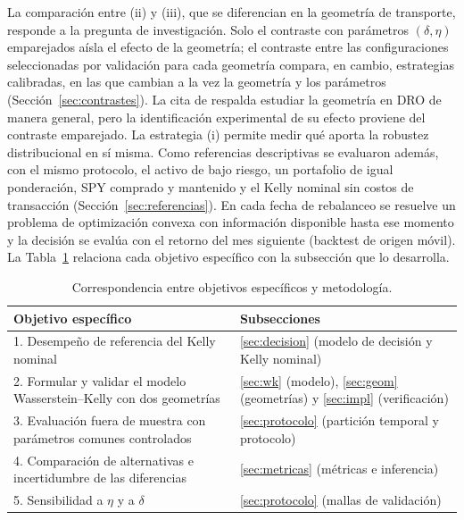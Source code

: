 La comparación entre (ii) y (iii), que se diferencian en la geometría de transporte, responde a la pregunta de investigación. Solo el contraste con parámetros $(\delta,\eta)$ emparejados aísla el efecto de la geometría; el contraste entre las configuraciones seleccionadas por validación para cada geometría compara, en cambio, estrategias calibradas, en las que cambian a la vez la geometría y los parámetros (Sección~\ref{sec:contrastes}). La cita de \citet{liu2022} respalda estudiar la geometría en DRO de manera general, pero la identificación experimental de su efecto proviene del contraste emparejado. La estrategia (i) permite medir qué aporta la robustez distribucional en sí misma.
 Como referencias descriptivas se evaluaron además, con el mismo protocolo, el activo de bajo riesgo, un portafolio de igual ponderación, SPY comprado y mantenido y el Kelly nominal sin costos de transacción (Sección~\ref{sec:referencias}).
 En cada fecha de rebalanceo se resuelve un problema de optimización convexa con información disponible hasta ese momento y la decisión se evalúa con el retorno del mes siguiente (backtest de origen móvil). La Tabla~\ref{tab:objetivos} relaciona cada objetivo específico con la subsección que lo desarrolla.

\begin{table}[h]
\centering
\caption{Correspondencia entre objetivos específicos y metodología.}\label{tab:objetivos}
\begin{tabular}{|p{6.3cm}|p{8.7cm}|}
\hline
\textbf{Objetivo específico} & \textbf{Subsecciones} \\ \hline
1. Desempeño de referencia del Kelly nominal & \ref{sec:decision} (modelo de decisión y Kelly nominal) \\ \hline
2. Formular y validar el modelo Wasserstein--Kelly con dos geometrías & \ref{sec:wk} (modelo), \ref{sec:geom} (geometrías) y \ref{sec:impl} (verificación) \\ \hline
3. Evaluación fuera de muestra con parámetros comunes controlados & \ref{sec:protocolo} (partición temporal y protocolo) \\ \hline
4. Comparación de alternativas e incertidumbre de las diferencias & \ref{sec:metricas} (métricas e inferencia) \\ \hline
5. Sensibilidad a $\eta$ y a $\delta$ & \ref{sec:protocolo} (mallas de validación) \\ \hline
\end{tabular}
\end{table}

